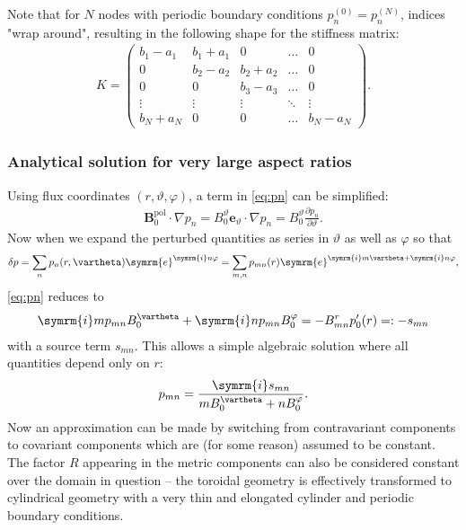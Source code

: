 \documentclass[a4paper, 10pt, english]{article}
\let\temp\varrho
\let\varrho\rho
\let\rho\temp
\let\temp\vartheta
\let\vartheta\theta
\let\theta\temp
\let\temp\varphi
\let\varphi\phi
\let\phi\temp
\let\vec\symbf
\newcommand*\e{\ensuremath{\symrm{e}}}  %
\newcommand*\im{\ensuremath{\symrm{i}}}  %
\newcommand*\pd[2][]{\ensuremath{\frac{\partial #1}{\partial #2}}}  %
\newcommand*\pol{\ensuremath{\textrm{pol}}}  %
\begin{document}
Note that for $N$ nodes with periodic boundary conditions $p_{n}^{(0)} = p_{n}^{(N)}$, indices "wrap around", resulting in the following shape for the stiffness matrix:
\begin{gather*}
  K = \begin{pmatrix}
    b_{1} - a_{1} &  b_{1} + a_{1} &        0       & \hdots &    0   \\
           0       & b_{2} - a_{2} &  b_{2} + a_{2} & \hdots &    0   \\
           0       &        0       & b_{3} - a_{3} & \hdots &    0   \\
        \vdots     &     \vdots     &     \vdots     & \ddots & \vdots \\
     b_{N} + a_{N} &        0       &        0       & \hdots & b_{N} - a_{N}
  \end{pmatrix}.
\end{gather*}

\subsubsection{Analytical solution for very large aspect ratios}

Using flux coordinates $(r, \theta, \phi)$, a term in \cref{eq:pn} can be simplified:
\begin{gather}
  \vec{B}_{0}^{\pol} \cdot \nabla p_{n} = B_{0}^{\theta} \vec{e}_{\theta} \cdot \nabla p_{n} = B_{0}^{\theta} \pd[p_{n}]{\theta}.
\end{gather}
Now when we expand the perturbed quantities as series in $\theta$ as well as $\phi$ so that
\begin{gather}
  \delta p = \sum_{n} p_n(r, \theta) \e^{\im n \phi} = \sum_{m, n} p_{mn}(r) \e^{\im m \theta + \im n \phi},
\end{gather}
\cref{eq:pn} reduces to
\begin{gather}
  \im m p_{mn} B_{0}^{\theta} + \im n p_{mn} B_{0}^{\phi} = -B_{mn}^{r} p_{0}'(r) =: -s_{mn}
\end{gather}
with a source term $s_{mn}$. This allows a simple algebraic solution where all quantities depend only on $r$:
\begin{gather}
  p_{mn} =  \frac{\im s_{mn}}{m B_{0}^{\theta} + n B_{0}^{\phi}}.
\end{gather}
Now an approximation can be made by switching from contravariant components to covariant components which are (for some reason) assumed to be constant. The factor $R$ appearing in the metric components can also be considered constant over the domain in question -- the toroidal geometry is effectively transformed to cylindrical geometry with a very thin and elongated cylinder and periodic boundary conditions.
\end{document}
